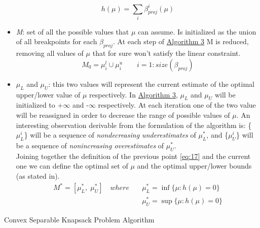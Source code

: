 \documentclass[12pt]{article}
\begin{document}
\begin{itemize}
	\begin{equation}\label{eq:16}
	    h(\mu) = \sum_i \beta_{proj}^i(\mu)
	\end{equation}
	\item \textit{M}: set of all the possible values that $\mu$ can assume. Is initialized as the union of all breakpoints for each $\beta_{proj}$. At each step of \hyperref[algo:3]{Algorithm 3} M is reduced, removing all values of $\mu$ that for sure won't satisfy the linear constraint.
	\begin{equation}\label{eq:17}
	    M_0 = {\mu_i^l} \cup {\mu_i^u} \qquad i = 1:size(\beta_{proj})
	\end{equation}
	\item $\mu_L$ and $\mu_U$: this two values will represent the current estimate of the optimal upper/lower value of $\mu$ respectively. In \hyperref[algo:3]{Algorithm 3}, $\mu_L$ and $\mu_U$ will be initialized to +$\infty$ and -$\infty$ respectively. At each iteration one of the two value will be reassigned in order to decrease the range of possible values of $\mu$.
	An interesting observation derivable from the formulation of the algorithm is: \{$\mu_L^i$\} will be a sequence of \textit{nondecreasing underestimates} of $\mu_L^*$, and \{$\mu_U^i$\} will be a sequence of \textit{nonincreasing overestimates} of $\mu_U^*$.\\ Joining together the definition of the previous point \eqref{eq:17} and the current one we can define the optimal set of $\mu$ and the optimal upper/lower bounds (as stated in\parencite{Kiwiel2008}).
	\begin{equation}\label{eq:18}
    	\begin{aligned}
    	    M^* = [ \mu_L^*,\;\mu_U^*] \quad where \quad &\mu_L^* = \inf \{\mu: h(\mu) = 0\}\\&\mu_U^* = \sup \{\mu: h(\mu) = 0\}
    	\end{aligned}
	\end{equation}
	\end{itemize}
	\begin{algorithm}[H]\label{algo:3}
    	\DontPrintSemicolon
    	\small
    	\SetAlgoNoEnd
    	\caption{Convex Separable Knapsack Problem Algorithm}
    \end{algorithm}
\end{document}
